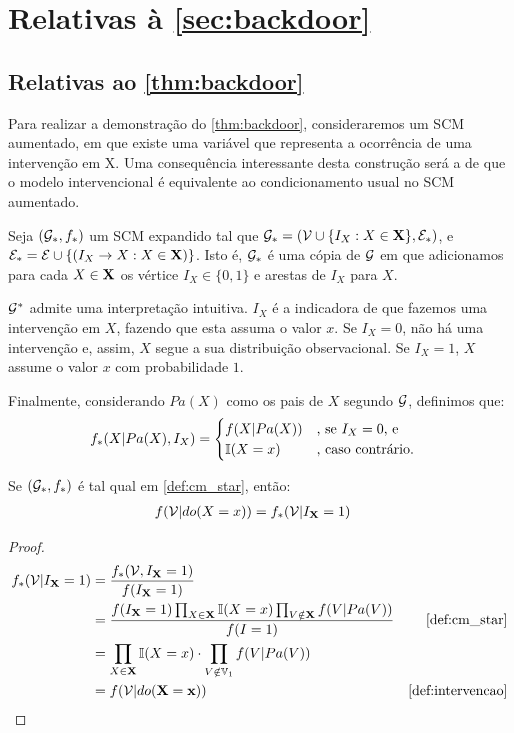 \section{Relativas à \cref{sec:backdoor}}

\subsection{Relativas ao \cref{thm:backdoor}}

Para realizar a demonstração do \cref{thm:backdoor},
consideraremos um SCM aumentado, 
em que existe uma variável que representa
a ocorrência de uma intervenção em X.
Uma consequência interessante desta construção será
a de que o modelo intervencional é equivalente
ao condicionamento usual no SCM aumentado.

\begin{definition}
 \label{def:cm_star}
 Seja $({\mathcal G}_*, f_*)$ um SCM expandido tal que
 ${\mathcal G}_* = ({\mathcal V} \cup \{I_X: X \in {\mathbf{X}}\}, {\mathcal E}_*)$, e
 ${\mathcal E}_* = {\mathcal E} \cup \{(I_X \rightarrow X: X \in {\mathbf{X}})\}$.
 Isto é, ${\mathcal G}_*$ é uma cópia de ${\mathcal G}$ em que
 adicionamos para cada $X \in {\mathbf{X}}$
 os vértice $I_X \in \{0,1\}$ e 
 arestas de $I_X$ para $X$.
 
 ${\mathcal G}^*$ admite uma interpretação intuitiva.
 $I_X$ é a indicadora de que fazemos uma intervenção em $X$,
 fazendo que esta assuma o valor $x$.
 Se $I_X = 0$, não há uma intervenção e, assim,
 $X$ segue a sua distribuição observacional.
 Se $I_X = 1$, $X$ assume o valor $x$ com probabilidade $1$.
 
 Finalmente, considerando $Pa(X)$ como os
 pais de $X$ segundo ${\mathcal G}$, definimos que:
 \begin{align*}
  f_*(X|Pa(X), I_X) 
  &= \begin{cases}
   f(X|Pa(X)) & \text{, se $I_X = 0$, e} \\
   {\mathbb I}(X = x) & \text{, caso contrário.}
  \end{cases}
 \end{align*}
\end{definition}

\begin{lemma}
 \label{lemma:backdoor_1}
 Se $({\mathcal G}_*, f_*)$ é tal qual em \cref{def:cm_star}, então:
 \begin{align*}
  f({\mathcal V}|do(X=x)) &= f_*({\mathcal V}|I_{{\mathbf{X}}}=1)
 \end{align*}
\end{lemma}

\begin{proof}
 \begin{align*}
  f_*(\sV|I_{\X} = 1) 
  &= \frac{f_*(\sV, I_{\X}=1)}{f(I_{\X}=1)} \\
  &= \frac{f(I_{\X}=1)\prod_{X \in \X}\I(X = x)\prod_{V \notin \X}f(V|Pa(V))}{f(I=1)}
  & \text{\cref{def:cm_star}} \\
  &= \prod_{X \in \X}\I(X = x) \cdot \prod_{V \notin \V_1}f(V|Pa(V)) \\
  &= f(\sV|do(\X=\x)) 
  & \text{\cref{def:intervencao}}
 \end{align*}
\end{proof}

